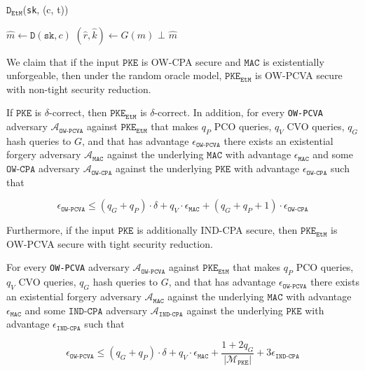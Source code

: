 \documentclass[floatrow,journal=tches,submission]{iacrtrans}
\newcommand{\monospace}{\texttt}
\newcommand{\pke}{\monospace{PKE}}
\newcommand{\decrypt}{\monospace{D}}
\newcommand{\etm}{\monospace{EtM}}  %
\newcommand{\mac}{\monospace{MAC}}
\newcommand{\verify}{\monospace{MAC.Verify}}
\newcommand{\sk}{\monospace{sk}}
\newcommand{\norm}[1]{\left\lvert #1 \right\rvert}
\begin{document}
\begin{algorithm}
    \caption{$\decrypt_\etm$(\sk, (c, t))}\label{alg:decrypt-etm}

    \begin{algorithmic}[1]
        \State $\hat{m} \leftarrow \decrypt(\sk, c)$
        \State $(\hat{r}, \hat{k}) \leftarrow G(m)$
        \If {$\verify(\hat{k}, c, t) = 0$}
            \State \Return $\bot$
        \EndIf
        \State \Return $\hat{m}$
    \end{algorithmic}
\end{algorithm}

We claim that if the input $\pke$ is OW-CPA secure and $\mac$ is existentially unforgeable, then under the random oracle model, $\pke_\etm$ is OW-PCVA secure with non-tight security reduction.

\begin{theorem}\label{thm:if-owcpa-then-owpcva}
    If $\pke$ is $\delta$-correct, then $\pke_\etm$ is $\delta$-correct. In addition, for every \monospace{OW-PCVA} adversary $\mathcal{A}_\monospace{OW-PCVA}$ against $\pke_\etm$ that makes $q_P$ PCO queries, $q_V$ CVO queries, $q_G$ hash queries to $G$, and that has advantage $\epsilon_\monospace{OW-PCVA}$ there exists an existential forgery adversary $\mathcal{A}_\mac$ against the underlying $\mac$ with advantage $\epsilon_\mac$ and some $\monospace{OW-CPA}$ adversary $\mathcal{A}_\monospace{OW-CPA}$ against the underlying $\pke$ with advantage $\epsilon_\monospace{OW-CPA}$ such that

    \begin{equation*}
        \epsilon_\monospace{OW-PCVA}
        \leq (q_G + q_P) \cdot \delta
            + q_V \cdot \epsilon_\mac
            + (q_G + q_P + 1) \cdot \epsilon_\monospace{OW-CPA}
    \end{equation*}
\end{theorem}

Furthermore, if the input $\pke$ is additionally IND-CPA secure, then $\pke_\etm$ is OW-PCVA secure with tight security reduction.

\begin{corollary}\label{thm:if-indcpa-then-owpcva}
    For every \monospace{OW-PCVA} adversary $\mathcal{A}_\monospace{OW-PCVA}$ against $\pke_\etm$ that makes $q_P$ PCO queries, $q_V$ CVO queries, $q_G$ hash queries to $G$, and that has advantage $\epsilon_\monospace{OW-PCVA}$ there exists an existential forgery adversary $\mathcal{A}_\mac$ against the underlying $\mac$ with advantage $\epsilon_\mac$ and some $\monospace{IND-CPA}$ adversary $\mathcal{A}_\monospace{IND-CPA}$ against the underlying $\pke$ with advantage $\epsilon_\monospace{IND-CPA}$ such that

    \begin{equation*}
        \epsilon_\monospace{OW-PCVA}
        \leq (q_G + q_P) \cdot \delta
            + q_V \cdot \epsilon_\mac
            + \frac{1 + 2q_G}{\norm{\mathcal{M}_\pke}}
            + 3\epsilon_\monospace{IND-CPA}
    \end{equation*}
\end{corollary}
\end{document}
